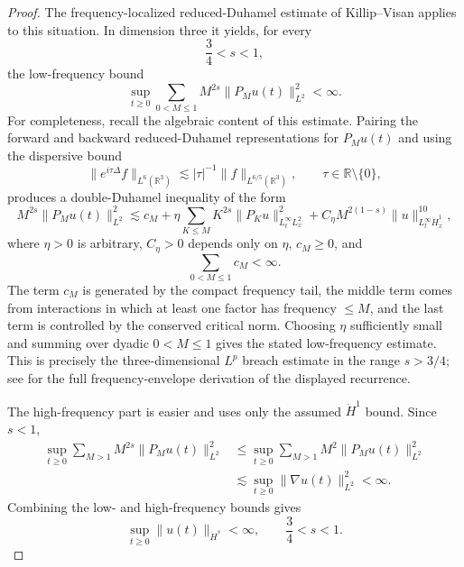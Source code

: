 \documentclass[smallextended,envcountsect,nospthms]{svjour3}
\numberwithin{equation}{section}
\theoremstyle{spbreak}
\theoremstyle{spdefbreak}
\theoremstyle{spdefbreak}
\newcommand{\R}{\mathbb R}
\begin{document}
\begin{proof}
The frequency-localized reduced-Duhamel estimate of Killip--Visan applies to this situation. In dimension three it yields, for every
\begin{equation*}
  \frac34<s<1,
\end{equation*}
the low-frequency bound
\begin{equation*}
  \sup_{t\ge0}\sum_{0<M\le1} M^{2s}\|P_Mu(t)\|_{L^2}^2<\infty.
\end{equation*}
For completeness, recall the algebraic content of this estimate. Pairing the forward and backward reduced-Duhamel representations for $P_Mu(t)$ and using the dispersive bound
\begin{equation*}
  \|e^{i\tau\Delta}f\|_{L^6(\R^3)}
  \lesssim |\tau|^{-1}\|f\|_{L^{6/5}(\R^3)},
  \qquad \tau\in\R\setminus\{0\},
\end{equation*}
produces a double-Duhamel inequality of the form
\begin{equation*}
  M^{2s}\|P_Mu(t)\|_{L^2}^2
  \lesssim c_M
  +\eta\sum_{K\le M}K^{2s}\|P_Ku\|_{L_t^\infty L_x^2}^2
  +C_\eta M^{2(1-s)}\|u\|_{L_t^\infty\dot H_x^1}^{10},
\end{equation*}
where $\eta>0$ is arbitrary, $C_\eta>0$ depends only on $\eta$, $c_M\ge0$, and
\begin{equation*}
  \sum_{0<M\le1}c_M<\infty.
\end{equation*}
The term $c_M$ is generated by the compact frequency tail, the middle term comes from interactions in which at least one factor has frequency $\le M$, and the last term is controlled by the conserved critical norm. Choosing $\eta$ sufficiently small and summing over dyadic $0<M\le1$ gives the stated low-frequency estimate. This is precisely the three-dimensional $L^p$ breach estimate in the range $s>3/4$; see \cite{KillipVisan2010,KillipVisan2013} for the full frequency-envelope derivation of the displayed recurrence.

The high-frequency part is easier and uses only the assumed $\dot H^1$ bound. Since $s<1$,
\begin{align*}
  \sup_{t\ge0}\sum_{M>1}M^{2s}\|P_Mu(t)\|_{L^2}^2
  &\le \sup_{t\ge0}\sum_{M>1}M^{2}\|P_Mu(t)\|_{L^2}^2  \\
  &\lesssim \sup_{t\ge0}\|\nabla u(t)\|_{L^2}^2
  <\infty.
\end{align*}
Combining the low- and high-frequency bounds gives
\begin{equation*}
  \sup_{t\ge0}\|u(t)\|_{\dot H^s}<\infty,
  \qquad \frac34<s<1.
\end{equation*}


\end{proof}
\end{document}
